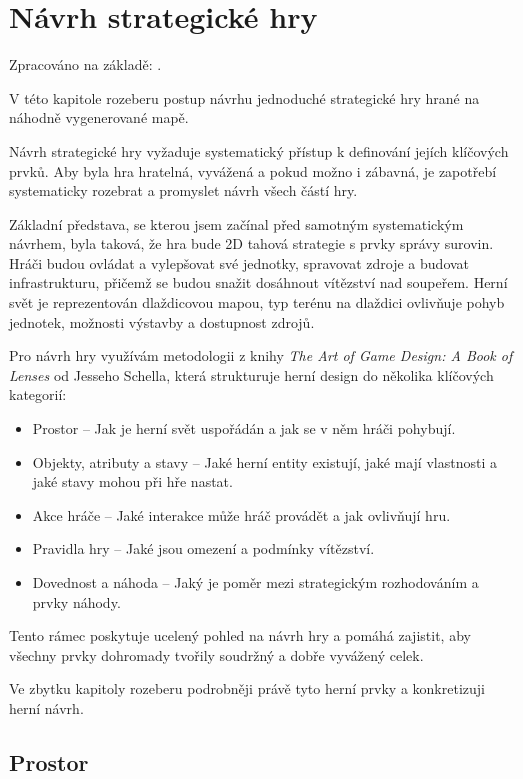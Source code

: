 \section{Návrh strategické hry}

Zpracováno na základě: \cite{} \cite{} \cite{}.

V této kapitole rozeberu postup návrhu jednoduché strategické hry hrané na náhodně vygenerované mapě.

Návrh strategické hry vyžaduje systematický přístup k definování jejích klíčových prvků. Aby byla hra hratelná, vyvážená a pokud možno i zábavná, je zapotřebí systematicky rozebrat a promyslet návrh všech částí hry. 

Základní představa, se kterou jsem začínal před samotným systematickým návrhem, byla taková, že hra bude 2D tahová strategie s prvky správy surovin. Hráči budou ovládat a vylepšovat své jednotky, spravovat zdroje a budovat infrastrukturu, přičemž se budou snažit dosáhnout vítězství nad soupeřem. Herní svět je reprezentován dlaždicovou mapou, typ terénu na dlaždici ovlivňuje pohyb jednotek, možnosti výstavby a dostupnost zdrojů.

Pro návrh hry využívám metodologii z knihy \textit{The Art of Game Design: A Book of Lenses} od Jesseho Schella, která strukturuje herní design do několika klíčových kategorií:

\begin{itemize}
    \item Prostor -- Jak je herní svět uspořádán a jak se v něm hráči pohybují.
    \item Objekty, atributy a stavy -- Jaké herní entity existují, jaké mají vlastnosti a jaké stavy mohou při hře nastat.
    \item Akce hráče -- Jaké interakce může hráč provádět a jak ovlivňují hru.
    \item Pravidla hry -- Jaké jsou omezení a podmínky vítězství.
    \item Dovednost a náhoda -- Jaký je poměr mezi strategickým rozhodováním a prvky náhody.
\end{itemize}

Tento rámec poskytuje ucelený pohled na návrh hry a pomáhá zajistit, aby všechny prvky dohromady tvořily soudržný a dobře vyvážený celek.

Ve zbytku kapitoly rozeberu podrobněji právě tyto herní prvky a konkretizuji herní návrh.

\subsection{Prostor}

